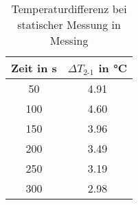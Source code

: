 \begin{table}[h!]
\begin{center}
\begin{tabular}{c | c}
	Zeit in \si{\second} & $\Delta T_\text{2-1}$ in \si{\celsius} \\
\hline
	50 & 4.91 \\
	100 & 4.60 \\
	150 & 3.96 \\
	200 & 3.49 \\
	250 & 3.19 \\
	300 & 2.98
\end{tabular}
\end{center}
\caption{Temperaturdifferenz bei statischer Messung in Messing}
\label{Delta T Messing}
\end{table}